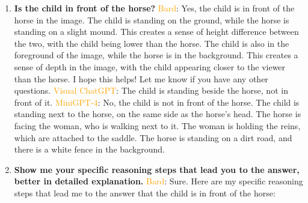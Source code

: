 \begin{enumerate}
        The child is standing on the ground, while the horse is standing on a slight mound. This creates a sense of height difference between the two, with the child being lower than the horse.
        The child is wearing a blue shirt and jeans, while the horse is a brown horse with a white mane and tail. This creates a contrast in color between the two, with the child being lighter in color than the horse.
        The child is in the foreground of the image, while the horse is in the background. This creates a sense of depth in the image, with the child appearing closer to the viewer than the horse.
        I hope this helps! Let me know if you have any other questions.
        \subitem \textcolor{orange}{Visual ChatGPT}: The woman is walking the horse, with the child standing beside them.
        \subitem \textcolor{orange}{MiniGPT-4}: The image shows a woman walking next to a horse. The woman is wearing a black helmet and black pants, and the horse is wearing a brown saddle and black bridle. The woman is holding the reins of the horse, which are attached to the saddle. The horse is standing on a dirt road, and there is a white fence in the background.
        \item \textbf{Is the child in front of the horse?}
        \subitem \textcolor{orange}{Bard}: Yes, the child is in front of the horse in the image. The child is standing on the ground, while the horse is standing on a slight mound. This creates a sense of height difference between the two, with the child being lower than the horse. The child is also in the foreground of the image, while the horse is in the background. This creates a sense of depth in the image, with the child appearing closer to the viewer than the horse.
        I hope this helps! Let me know if you have any other questions.
        \subitem \textcolor{orange}{Visual ChatGPT}: The child is standing beside the horse, not in front of it.
        \subitem \textcolor{orange}{MiniGPT-4}: No, the child is not in front of the horse. The child is standing next to the horse, on the same side as the horse’s head. The horse is facing the woman, who is walking next to it. The woman is holding the reins, which are attached to the saddle. The horse is standing on a dirt road, and there is a white fence in the background.
        \item \textbf{Show me your specific reasoning steps that lead you to the answer, better in detailed explanation.}
        \subitem \textcolor{orange}{Bard}: Sure. Here are my specific reasoning steps that lead me to the answer that the child is in front of the horse:


\end{enumerate}
